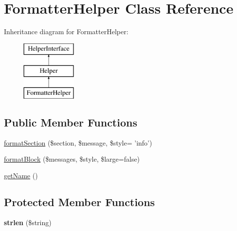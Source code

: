 \hypertarget{class_symfony_1_1_components_1_1_console_1_1_helper_1_1_formatter_helper}{
\section{FormatterHelper Class Reference}
\label{class_symfony_1_1_components_1_1_console_1_1_helper_1_1_formatter_helper}
}
Inheritance diagram for FormatterHelper:\begin{figure}[H]
\begin{center}
\leavevmode
\includegraphics[height=3.000000cm]{class_symfony_1_1_components_1_1_console_1_1_helper_1_1_formatter_helper}
\end{center}
\end{figure}
\subsection*{Public Member Functions}
\begin{DoxyCompactItemize}
\item 
\hyperlink{class_symfony_1_1_components_1_1_console_1_1_helper_1_1_formatter_helper_a5feac6fb165f98dcf737f124003403a9}{formatSection} (\$section, \$message, \$style= 'info')
\item 
\hyperlink{class_symfony_1_1_components_1_1_console_1_1_helper_1_1_formatter_helper_a903b0cecc57c97ae8110f80672eacf78}{formatBlock} (\$messages, \$style, \$large=false)
\item 
\hyperlink{class_symfony_1_1_components_1_1_console_1_1_helper_1_1_formatter_helper_a3d0963e68bb313b163a73f2803c64600}{getName} ()
\end{DoxyCompactItemize}
\subsection*{Protected Member Functions}
\begin{DoxyCompactItemize}
\item 
\hypertarget{class_symfony_1_1_components_1_1_console_1_1_helper_1_1_formatter_helper_aa280f76645efe62221dc1348ebbbbd26}{
{\bfseries strlen} (\$string)}
\label{class_symfony_1_1_components_1_1_console_1_1_helper_1_1_formatter_helper_aa280f76645efe62221dc1348ebbbbd26}

\end{DoxyCompactItemize}



